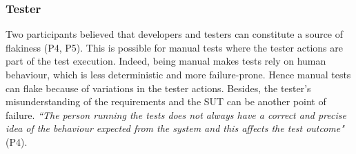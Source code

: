 \subsubsection{\textbf{Tester}}
Two participants believed that developers and testers can constitute a source of flakiness (P4, P5).
This is possible for manual tests where the tester actions are part of the test execution.
Indeed, being manual makes tests rely on human behaviour, which is less deterministic and more failure-prone.
Hence manual tests can flake because of variations in the tester actions.
Besides, the tester's misunderstanding of the requirements and the SUT can be another point of failure.
\textit{``The person running the tests does not always have a correct and precise idea of the behaviour expected from the system and this affects the test outcome"} (P4).



 

